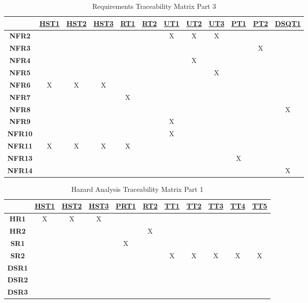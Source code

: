 \documentclass[12pt, titlepage]{article}
\begin{document}
\begin{table}[H]
	\centering
	\begin{tabular}{|c|c|c|c|c|c|c|c|c|c|c|c|}
	\hline
	& \hyperref[HST1]{HST1}&\hyperref[HST2]{HST2}& \hyperref[HST3]{HST3}&\hyperref[RT1]{RT1}&\hyperref[RT2]{RT2}&\hyperref[UT1]{UT1}&\hyperref[UT2]{UT2}&\hyperref[UT3]{UT3}&\hyperref[PT1]{PT1}&\hyperref[PT2]{PT2}&\hyperref[DSQT1]{DSQT1} \\
	\hline       
	\textbf{NFR2}         &&&&&&X&X&X&&&\\ \hline
	\textbf{NFR3}         &&&&&&&&&&X& \\ \hline
	\textbf{NFR4}         &&&&&&&X&&&&\\ \hline
	\textbf{NFR5}         &&&&&&&&X&&& \\ \hline
	\textbf{NFR6}         &X&X&X&&&&&&&&\\ \hline
	\textbf{NFR7}         &&&&X&&&&&&&\\ \hline
	\textbf{NFR8}         &&&&&&&&&&&X\\ \hline
	\textbf{NFR9}         &&&&&&X&&&&&\\ \hline
	\textbf{NFR10}       &&&&&&X&&&&&\\ \hline
	\textbf{NFR11}       &X&X&X&X&&&&&&&\\ \hline
	\textbf{NFR13}       &&&&&&&&&X&&\\ \hline
	\textbf{NFR14}       &&&&&&&&&&&X\\ \hline
	\hline
	\end{tabular}
	\caption{Requirements Traceability Matrix Part 3}
	\label{Table:C_trace}
\end{table}

\begin{table}[H]
	\centering
	\begin{tabular}{|c|c|c|c|c|c|c|c|c|c|c|}
	\hline
	& \hyperref[HST1]{HST1}&\hyperref[HST2]{HST2}& \hyperref[HST3]{HST3} &\hyperref[PRT1]{PRT1}&\hyperref[RT2]{RT2}&\hyperref[TT1]{TT1}&\hyperref[TT2]{TT2}&\hyperref[TT3]{TT3}&\hyperref[TT4]{TT4}&\hyperref[TT5]{TT5} \\
	\hline       
	\textbf{HR1}         &X&X&X&&&&&&& \\ \hline
	\textbf{HR2}         &&&&&X&&&&& \\ \hline
	\textbf{SR1}         &&&&X&&&&&& \\ \hline
	\textbf{SR2}         &&&&&&X&X&X&X&X \\ \hline
	\textbf{DSR1}       &&&&&&&&&& \\ \hline
	\textbf{DSR2}       &&&&&&&&&& \\ \hline
	\textbf{DSR3}       &&&&&&&&&& \\ \hline
	\hline
	\end{tabular}
	\caption{Hazard Analysis Traceability Matrix Part 1}
	\label{Table:C_trace}
\end{table}
\end{document}
